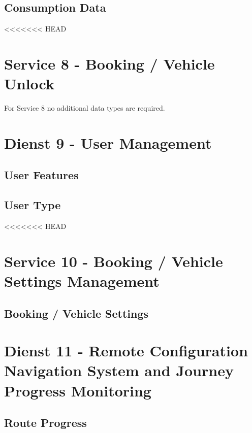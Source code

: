 \subsection*{Consumption Data}



<<<<<<< HEAD
\section{Service 8 - Booking / Vehicle Unlock}
\label{sec:Datenmodell:Dienst8}
For Service 8 no additional data types are required.

\section{Dienst 9 - User Management}
\label{sec:Datenmodell:Dienst9}

\subsection*{User Features}



\subsection*{User Type}



<<<<<<< HEAD
\section{Service 10 - Booking / Vehicle Settings Management}
\label{sec:Datenmodell:Dienst10}

\subsection*{Booking / Vehicle Settings}



\section{Dienst 11 - Remote Configuration Navigation System and Journey Progress Monitoring}
\label{sec:Datenmodell:Dienst11}

\subsection*{Route Progress}




